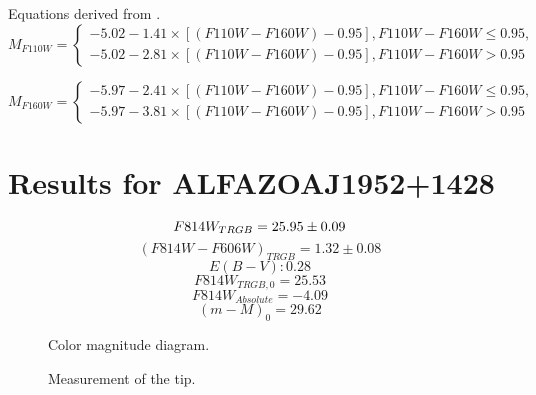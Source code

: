 \documentclass[12,manuscript,usenatbib]{aastex}
\begin{document}
Equations derived from \citet{2014AJ....148....7W}.
\begin{equation}
M_{F110W}=\left\{\begin{matrix}
-5.02 -1.41 \times [(F110W-F160W)-0.95], F110W-F160W \leqslant 0.95,
\\ 
-5.02 -2.81 \times[(F110W-F160W)-0.95], F110W-F160W > 0.95
\end{matrix}\right.
\end{equation}

\begin{equation}
M_{F160W}=\left\{\begin{matrix}
-5.97 -2.41 \times [(F110W-F160W)-0.95], F110W-F160W \leqslant 0.95,
\\ 
-5.97 -3.81 \times[(F110W-F160W)-0.95], F110W-F160W > 0.95
\end{matrix}\right.
\end{equation}




\section{Results for ALFAZOAJ1952+1428}

\begin{equation}
F814W_{TRGB}=25.95 \pm 0.09 \\
\end{equation}
\begin{equation}
(F814W-F606W)_{TRGB}=1.32 \pm 0.08
\end{equation}
\begin{equation}
E(B-V): 0.28
\end{equation}
\begin{equation}
F814W_{TRGB,0} = 25.53
\end{equation}
\begin{equation}
F814W_{Absolute} = -4.09
\end{equation}
\begin{equation}
(m-M)_0=29.62
\end{equation}

\begin{figure}
\caption{Color magnitude diagram.\label{cmd1}}
\end{figure}

\begin{figure}
\caption{Measurement of the tip.\label{lf1}}
\end{figure}
\end{document}
